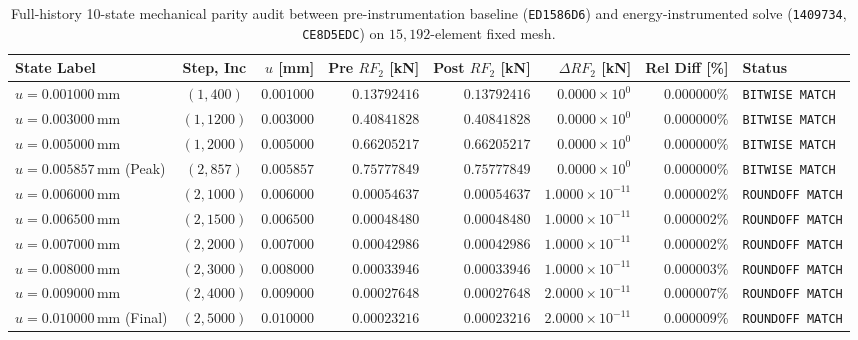 \begin{table}[htbp]
\centering
\caption{Full-history 10-state mechanical parity audit between pre-instrumentation baseline (\nolinkurl{ED1586D6}) and energy-instrumented solve (\texttt{1409734}, \nolinkurl{CE8D5EDC}) on $15{,}192$-element fixed mesh.}
\label{tab:matched_parity_pack}
\fontsize{7.5}{9.0}\selectfont
\begin{tabularx}{\textwidth}{lcrrrrrl}
\toprule
\textbf{State Label} & \textbf{Step, Inc} & \textbf{$u$ [mm]} & \textbf{Pre $RF_2$ [kN]} & \textbf{Post $RF_2$ [kN]} & \textbf{$\Delta RF_2$ [kN]} & \textbf{Rel Diff [\%]} & \textbf{Status} \\
\midrule
$u = 0.001000\,\mathrm{mm}$ & $(1, 400)$ & $0.001000$ & $0.13792416$ & $0.13792416$ & $0.0000\times 10^{0}$ & $0.000000\%$ & \texttt{BITWISE MATCH} \\
$u = 0.003000\,\mathrm{mm}$ & $(1, 1200)$ & $0.003000$ & $0.40841828$ & $0.40841828$ & $0.0000\times 10^{0}$ & $0.000000\%$ & \texttt{BITWISE MATCH} \\
$u = 0.005000\,\mathrm{mm}$ & $(1, 2000)$ & $0.005000$ & $0.66205217$ & $0.66205217$ & $0.0000\times 10^{0}$ & $0.000000\%$ & \texttt{BITWISE MATCH} \\
$u = 0.005857\,\mathrm{mm}$ (Peak) & $(2, 857)$ & $0.005857$ & $0.75777849$ & $0.75777849$ & $0.0000\times 10^{0}$ & $0.000000\%$ & \texttt{BITWISE MATCH} \\
$u = 0.006000\,\mathrm{mm}$ & $(2, 1000)$ & $0.006000$ & $0.00054637$ & $0.00054637$ & $1.0000\times 10^{-11}$ & $0.000002\%$ & \texttt{ROUNDOFF MATCH} \\
$u = 0.006500\,\mathrm{mm}$ & $(2, 1500)$ & $0.006500$ & $0.00048480$ & $0.00048480$ & $1.0000\times 10^{-11}$ & $0.000002\%$ & \texttt{ROUNDOFF MATCH} \\
$u = 0.007000\,\mathrm{mm}$ & $(2, 2000)$ & $0.007000$ & $0.00042986$ & $0.00042986$ & $1.0000\times 10^{-11}$ & $0.000002\%$ & \texttt{ROUNDOFF MATCH} \\
$u = 0.008000\,\mathrm{mm}$ & $(2, 3000)$ & $0.008000$ & $0.00033946$ & $0.00033946$ & $1.0000\times 10^{-11}$ & $0.000003\%$ & \texttt{ROUNDOFF MATCH} \\
$u = 0.009000\,\mathrm{mm}$ & $(2, 4000)$ & $0.009000$ & $0.00027648$ & $0.00027648$ & $2.0000\times 10^{-11}$ & $0.000007\%$ & \texttt{ROUNDOFF MATCH} \\
$u = 0.010000\,\mathrm{mm}$ (Final) & $(2, 5000)$ & $0.010000$ & $0.00023216$ & $0.00023216$ & $2.0000\times 10^{-11}$ & $0.000009\%$ & \texttt{ROUNDOFF MATCH} \\
\bottomrule
\end{tabularx}
\end{table}

